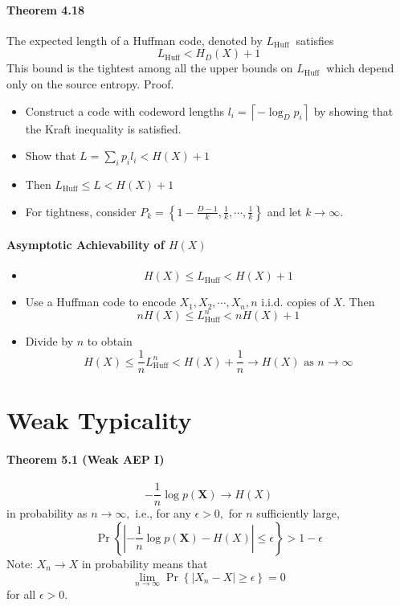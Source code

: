 \documentclass[8pt]{article}
\begin{document}
\paragraph{Theorem 4.18} The expected length of a Huffman code, denoted by $L_{\text {Huff }}$ satisfies
$$
L_{\mathrm{Huff}}<H_{D}(X)+1
$$
This bound is the tightest among all the upper bounds on $L_{\text {Huff }}$ which depend only on the source entropy.
Proof.
\begin{itemize}
	\item Construct a code with codeword lengths $l_{i}=\left\lceil-\log _{D} p_{i}\right\rceil$ by showing that the Kraft inequality is satisfied.
	\item Show that $L=\sum_{i} p_{i} l_{i}<H(X)+1$
	\item Then $L_{\mathrm{Huff}} \leq L<H(X)+1$
	\item For tightness, consider $P_{k}=\left\{1-\frac{D-1}{k}, \frac{1}{k}, \cdots, \frac{1}{k}\right\}$ and let $k \rightarrow \infty$.
\end{itemize}

\paragraph{Asymptotic Achievability of $H(X)$}
\begin{itemize}
	\item $$
	H(X) \leq L_{\mathrm{Huff}}<H(X)+1
	$$
	\item Use a Huffman code to encode $X_{1}, X_{2}, \cdots, X_{n}, n$ i.i.d. copies of $X .$ Then
	$$
	n H(X) \leq L_{\mathrm{Huff}}^{n}<n H(X)+1
	$$
	\item Divide by $n$ to obtain
	$$
	H(X) \leq \frac{1}{n} L_{\mathrm{Huff}}^{n}<H(X)+\frac{1}{n} \rightarrow H(X) \text { as } n \rightarrow \infty
	$$
\end{itemize}

\section{Weak Typicality}
\paragraph{Theorem 5.1 (Weak AEP I)}
$$
-\frac{1}{n} \log p(\mathbf{X}) \rightarrow H(X)
$$
in probability as $n \rightarrow \infty,$ i.e., for any $\epsilon>0,$ for $n$ sufficiently large,
$$
\operatorname{Pr}\left\{\left|-\frac{1}{n} \log p(\mathbf{X})-H(X)\right| \leq \epsilon\right\}>1-\epsilon
$$
Note: $X_{n} \rightarrow X$ in probability means that
$$
\lim _{n \rightarrow \infty} \operatorname{Pr}\left\{\left|X_{n}-X\right| \geq \epsilon\right\}=0
$$
for all $\epsilon>0$.
\end{document}
